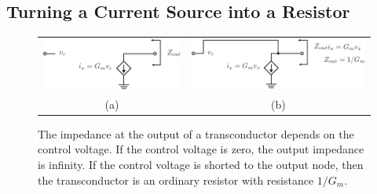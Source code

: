 \subsection{Turning a Current Source into a Resistor}

\begin{figure}[tb]
\begin{center}
\begin{tabular}{cc}
\includegraphics[width=.4\columnwidth]{tia_zout} &
\includegraphics[width=.4\columnwidth]{tia_zout_fb} \\
(a) & (b) \\
\end{tabular}
\end{center}
\caption{The impedance at the output of a transconductor depends on the control voltage. If the control voltage is zero, the output impedance is infinity.  If the control voltage is shorted to the output node, then the transconductor is an ordinary resistor with resistance $1/G_m$.} \label{fig:tia_zout}
\end{figure}

